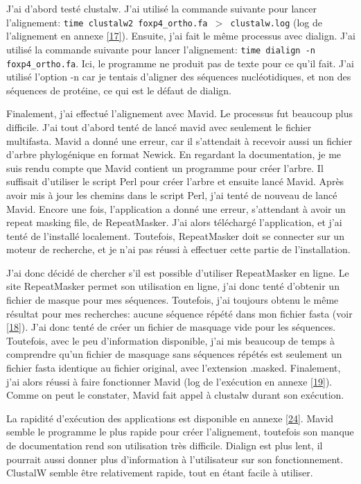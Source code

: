 \documentclass[10.8pt]{article} %
\begin{document}
J'ai d'abord testé clustalw. J'ai utilisé la commande suivante pour lancer l'alignement: 
\texttt{time clustalw2 foxp4\_ortho.fa $>$ clustalw.log} (log de l'alignement en annexe \ref{17}). Ensuite,
j'ai fait le même processus avec dialign. J'ai utilisé la commande suivante pour lancer l'alignement:
\texttt{time dialign -n foxp4\_ortho.fa}. Ici, le programme ne produit pas de texte pour ce qu'il fait. J'ai
utilisé l'option -n car je tentais d'aligner des séquences nucléotidiques, et non des séquences de protéine,
ce qui est le défaut de dialign.

Finalement, j'ai effectué l'alignement avec Mavid. Le processus fut beaucoup plus difficile. J'ai tout d'abord
tenté de lancé mavid avec seulement le fichier multifasta. Mavid a donné une erreur, car il s'attendait à
recevoir aussi un fichier d'arbre phylogénique en format Newick. En regardant la documentation, je me
suis rendu compte que Mavid contient un programme pour créer l'arbre. Il suffisait d'utiliser le script
Perl pour créer l'arbre et ensuite lancé Mavid. Après avoir mis à jour les chemins dans le script Perl,
j'ai tenté de nouveau de lancé Mavid. Encore une fois, l'application a donné une erreur, s'attendant à
avoir un repeat masking file, de RepeatMasker. J'ai alors téléchargé l'application, et j'ai tenté de
l'installé localement. Toutefois, RepeatMasker doit se connecter sur un moteur de recherche, et je n'ai
pas réussi à effectuer cette partie de l'installation.

J'ai donc décidé de chercher s'il est possible d'utiliser RepeatMasker en ligne. Le site RepeatMasker permet
son utilisation en ligne, j'ai donc tenté d'obtenir un fichier de masque pour mes séquences. Toutefois, j'ai
toujours obtenu le même résultat pour mes recherches: aucune séquence répété dans mon fichier fasta (voir \ref{18}).
J'ai donc tenté de créer un fichier de masquage vide pour les séquences. Toutefois, avec le peu d'information disponible,
j'ai mis beaucoup de temps à comprendre qu'un fichier de masquage sans séquences répétés est seulement un fichier
fasta identique au fichier original, avec l'extension .masked. Finalement, j'ai alors réussi à faire fonctionner
Mavid (log de l'exécution en annexe \ref{19}). Comme on peut le constater, Mavid fait appel à clustalw durant son
exécution.

La rapidité d'exécution des applications est disponible en annexe \ref{24}. Mavid semble le programme le plus rapide pour
créer l'alignement, toutefois son manque de documentation rend son utilisation très difficile. Dialign est plus lent,
il pourrait aussi donner plus d'information à l'utilisateur sur son fonctionnement. ClustalW semble être relativement
rapide, tout en étant facile à utiliser.
\end{document}
